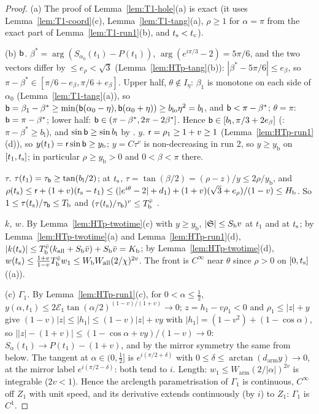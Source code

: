 \begin{proof}
(a) The proof of Lemma~\ref{lem:T1-hole}(a) is exact (it uses Lemma~\ref{lem:T1-coord}(c), Lemma~\ref{lem:T1-tang}(a), $\rho\ge1$ for
$\alpha=\pi$ from the exact part of Lemma~\ref{lem:T1-run1}(b), and $t_{\mathrm s}<t_{\mathrm c}$).

(b) \emph{$\mathsf b$.} $\beta^*=\arg(S_{\alpha_0}(t_1)-P(t_1))$, $\arg(e^{i\pi/3}-2)=5\pi/6$, and the two vectors differ by $\le e_\rho<\sqrt3$
(Lemma~\ref{lem:HTp-tang}(b)): $|\beta^*-5\pi/6|\le e_\beta$, so $\pi-\beta^*\in[\pi/6-e_\beta,\pi/6+e_\beta]$. Upper half, $\theta\notin I_\eta$:
$\beta_1$ is monotone on each side of $\alpha_0$ (Lemma~\ref{lem:T1-tang}(a)), so $\mathsf b=\beta_1-\beta^*\ge\min(\mathsf b(\alpha_0-\eta),
\mathsf b(\alpha_0+\eta))\ge b_{\mathrm{lo}}\eta^2=b_{\mathrm l}$, and $\mathsf b<\pi-\beta^*$; $\theta=\pi$: $\mathsf b=\pi-\beta^*$; lower half:
$\mathsf b\in(\pi-\beta^*,2\pi-2\beta^*]$. Hence $\mathsf b\in[b_{\mathrm l},\pi/3+2e_\beta]$ (: $\pi-\beta^*\ge b_{\mathrm l}$), and
$\sin\mathsf b\ge\sin b_{\mathrm l}$ by . \emph{$y$.} $\mathsf r=\rho_1\ge1+v\ge1$ (Lemma~\ref{lem:HTp-run1}(d)), so
$y(t_1)=\mathsf r\sin\mathsf b\ge y_{\mathrm b}$; $y=C\tau^v$ is non-decreasing in run 2, so $y\ge y_{\mathrm b}$ on $[t_1,t_{\mathrm s}]$; in particular
$\rho\ge y_{\mathrm b}>0$ and $0<\beta<\pi$ there.

\emph{$\tau$.} $\tau(t_1)=\tau_{\mathsf b}\ge\tan(b_{\mathrm l}/2)$; at $t_{\mathrm s}$, $\tau=\tan(\beta/2)=(\rho-z)/y\le2\rho/y_{\mathrm b}$, and
$\rho(t_{\mathrm s})\le\mathsf r+(1+v)(t_{\mathrm s}-t_1)\le(|e^{i\theta}-2|+d_1)+(1+v)(\sqrt3+e_\rho)/(1-v)\le H_{\mathrm b}$. So $1\le\tau(t_{\mathrm s})/\tau_{\mathsf b}\le
T_{\mathrm b}$ and $(\tau(t_{\mathrm s})/\tau_{\mathsf b})^v\le T_{\mathrm b}^{\bar v}$ .

\emph{$k$, $w$.} By Lemma~\ref{lem:HTp-twotime}(c) with $y\ge y_{\mathrm b}$, $|\mathfrak S|\le S_{\mathrm b}v$ at $t_1$ and at $t_{\mathrm s}$; by
Lemma~\ref{lem:HTp-twotime}(a) and Lemma~\ref{lem:HTp-run1}(d), $|k(t_{\mathrm s})|\le T_{\mathrm b}^{\bar v}(k_{\mathrm{all}}+S_{\mathrm b}\bar v)+
S_{\mathrm b}\bar v=K_{\mathrm b}$; by Lemma~\ref{lem:HTp-twotime}(d), $w(t_{\mathrm s})\le\frac{1+v}{1-v}T_{\mathrm b}^{\bar v}w_1\le
W_{\mathrm b}W_{\mathrm{all}}(2/\chi)^{2v}$. The front is $C^\infty$ near $\theta$ since $\rho>0$ on $[0,t_{\mathrm s}]$ ((a)).

(c) \emph{$\Gamma_1$.} By Lemma~\ref{lem:HTp-run1}(c), for $0<\alpha\le\frac12$, $y(\alpha,t_1)\le2\mathcal E_1\tan(\alpha/2)^{(1-v)/(1+v)}\to0$;
$z=h_1-v\rho_1<0$ and $\rho_1\le|z|+y$ give $(1-v)|z|\le|h_1|\le(1-v)|z|+vy$ with $|h_1|=(1-v^2)+(1-\cos\alpha)$, so
$\bigl||z|-(1+v)\bigr|\le(1-\cos\alpha+vy)/(1-v)\to0$: $S_\alpha(t_1)\to P(t_1)-(1+v)$, and by the mirror symmetry the same from below.
The tangent at $\alpha\in(0,\frac12]$ is $e^{i(\pi/2+\delta)}$ with $0\le\delta\le\arctan(d_{\mathrm{arm}}y)\to0$, at the mirror label
$e^{i(\pi/2-\delta)}$: both tend to $i$. Length: $w_1\le W_{\mathrm{arm}}(2/|\alpha|)^{2v}$ is integrable ($2v<1$). Hence the arclength
parametrisation of $\Gamma_1$ is continuous, $C^\infty$ off $Z_1$ with unit speed, and its derivative extends continuously (by $i$) to
$Z_1$: $\Gamma_1$ is $C^1$.


\end{proof}
